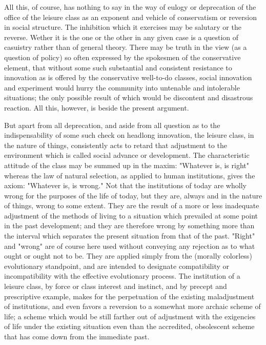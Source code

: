 \documentclass[12pt]{report}
\begin{document}
All this, of course, has nothing to say in the way of eulogy or
deprecation of the office of the leisure class as an exponent and
vehicle of conservatism or reversion in social structure. The inhibition
which it exercises may be salutary or the reverse. Wether it is the one
or the other in any given case is a question of casuistry rather than of
general theory. There may be truth in the view (as a question of policy)
so often expressed by the spokesmen of the conservative element, that
without some such substantial and consistent resistance to innovation as
is offered by the conservative well-to-do classes, social innovation
and experiment would hurry the community into untenable and intolerable
situations; the only possible result of which would be discontent and
disastrous reaction. All this, however, is beside the present argument.

But apart from all deprecation, and aside from all question as to the
indispensability of some such check on headlong innovation, the leisure
class, in the nature of things, consistently acts to retard that
adjustment to the environment which is called social advance or
development. The characteristic attitude of the class may be summed
up in the maxim: "Whatever is, is right" whereas the law of natural
selection, as applied to human institutions, gives the axiom: "Whatever
is, is wrong." Not that the institutions of today are wholly wrong
for the purposes of the life of today, but they are, always and in the
nature of things, wrong to some extent. They are the result of a more or
less inadequate adjustment of the methods of living to a situation which
prevailed at some point in the past development; and they are therefore
wrong by something more than the interval which separates the present
situation from that of the past. "Right" and "wrong" are of course here
used without conveying any rejection as to what ought or ought not to
be. They are applied simply from the (morally colorless) evolutionary
standpoint, and are intended to designate compatibility or
incompatibility with the effective evolutionary process. The institution
of a leisure class, by force or class interest and instinct, and by
precept and prescriptive example, makes for the perpetuation of the
existing maladjustment of institutions, and even favors a reversion to
a somewhat more archaic scheme of life; a scheme which would be still
farther out of adjustment with the exigencies of life under the existing
situation even than the accredited, obsolescent scheme that has come
down from the immediate past.
\end{document}

